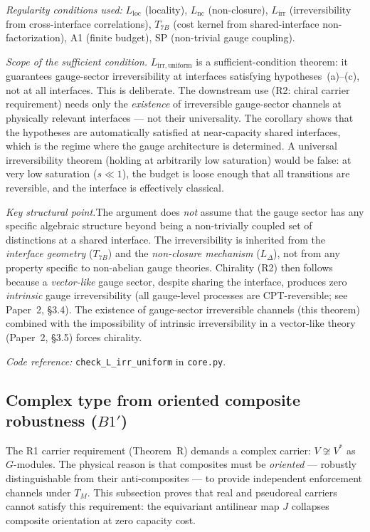 \documentclass[11pt,a4paper]{article}
\theoremstyle{definition}
\newcommand{\coderef}[2]{\smallskip\noindent\textit{Code reference:} \texttt{#1} in \texttt{#2}.}
\begin{document}
\noindent\textit{Regularity conditions used:}
$L_{\mathrm{loc}}$ (locality), $L_{\mathrm{nc}}$ (non-closure),
$L_{\mathrm{irr}}$ (irreversibility from cross-interface correlations),
$T_{7B}$ (cost kernel from shared-interface non-factorization),
A1 (finite budget), SP (non-trivial gauge coupling).

\smallskip\noindent\textit{Scope of the sufficient condition.}\quad
$L_{\mathrm{irr,uniform}}$ is a sufficient-condition theorem: it
guarantees gauge-sector irreversibility at interfaces satisfying
hypotheses~(a)--(c), not at all interfaces.  This is deliberate.
The downstream use (R2: chiral carrier requirement) needs only the
\emph{existence} of irreversible gauge-sector channels at physically
relevant interfaces --- not their universality.  The corollary shows
that the hypotheses are automatically satisfied at near-capacity
shared interfaces, which is the regime where the gauge architecture
is determined.  A universal irreversibility theorem (holding at
arbitrarily low saturation) would be false: at very low saturation
($s \ll 1$), the budget is loose enough that all transitions are
reversible, and the interface is effectively classical.

\smallskip\noindent\textit{Key structural point.}\quad The argument does
\emph{not} assume that the gauge sector has any specific algebraic
structure beyond being a non-trivially coupled set of distinctions at a
shared interface.  The irreversibility is inherited from the \emph{interface
geometry} ($T_{7B}$) and the \emph{non-closure mechanism} ($L_\Delta$),
not from any property specific to non-abelian gauge theories.  Chirality
(R2) then follows because a \emph{vector-like} gauge sector, despite
sharing the interface, produces zero \emph{intrinsic} gauge irreversibility
(all gauge-level processes are CPT-reversible; see Paper~2, \S3.4).  The existence of gauge-sector irreversible
channels (this theorem) combined with the impossibility of intrinsic
irreversibility in a vector-like theory (Paper~2, §3.5) forces chirality.

\coderef{check\_L\_irr\_uniform}{core.py}


\subsection{Complex type from oriented composite robustness ($B1'$)}
\label{sec:B1prime}

The R1 carrier requirement (Theorem~R) demands a complex carrier:
$V \not\cong V^*$ as $G$-modules.  The physical reason is that composites
must be \emph{oriented} --- robustly distinguishable from their
anti-composites --- to provide independent enforcement channels under $T_M$.
This subsection proves that real and pseudoreal carriers cannot satisfy
this requirement: the equivariant antilinear map $J$ collapses composite
orientation at zero capacity cost.
\end{document}
